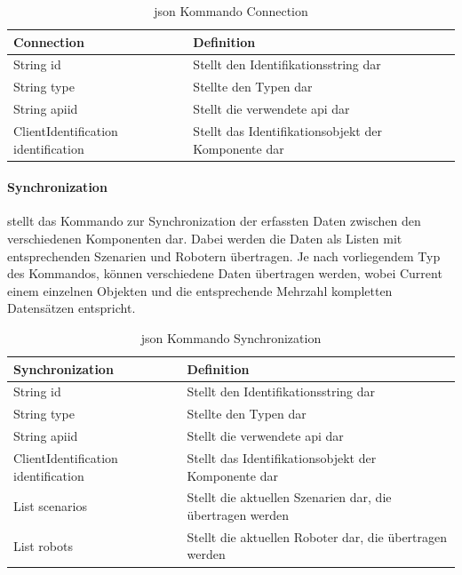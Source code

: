 \begin{table}[h]
	\centering
	\begin{tabular}{|p{4cm}|p{8cm}|}
		\hline
		\textbf{Connection} & Definition\\
		\hline
		String id & Stellt den Identifikationsstring dar \\
		String type & Stellte den Typen dar \\
		String apiid & Stellt die verwendete \gls{api} dar \\
		ClientIdentification identification & Stellt das Identifikationsobjekt der Komponente dar \\
		\hline
	\end{tabular}
	\caption[\gls{json} Kommando Connection]{\gls{json} Kommando Connection}
	\label{tab:Connection}
\end{table}

\paragraph{Synchronization} stellt das Kommando zur Synchronization der erfassten Daten zwischen den verschiedenen Komponenten dar. Dabei werden die Daten als Listen mit entsprechenden Szenarien und Robotern übertragen. Je nach vorliegendem Typ des Kommandos, können verschiedene Daten übertragen werden, wobei Current einem einzelnen Objekten und die entsprechende Mehrzahl kompletten Datensätzen entspricht.

\begin{table}[h]
	\centering
	\begin{tabular}{|p{4cm}|p{10cm}|}
		\hline
		\textbf{Synchronization} & Definition\\
		\hline
		String id & Stellt den Identifikationsstring dar \\
		String type & Stellte den Typen dar \\
		String apiid & Stellt die verwendete \gls{api} dar \\
		ClientIdentification identification & Stellt das Identifikationsobjekt der Komponente dar \\
		List scenarios & Stellt die aktuellen Szenarien dar, die übertragen werden\\
		List robots & Stellt die aktuellen Roboter dar, die übertragen werden \\
		\hline
	\end{tabular}
	\caption[\gls{json} Kommando Synchronization]{\gls{json} Kommando Synchronization}
	\label{tab:Synchronization}
\end{table}

